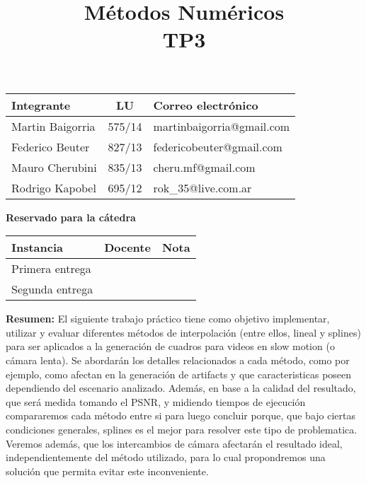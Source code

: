 \documentclass[10pt,a4paper]{article}
\title{Métodos Numéricos \\ TP3}
\begin{document}
\maketitle

\bigskip

\begin{table}[h]
\centering
\begin{tabular}{|l l l|}
\hline
Integrante       & \multicolumn{1}{c}{LU}     & Correo electrónico        \\ \hline
Martin Baigorria & \multicolumn{1}{c}{575/14} & martinbaigorria@gmail.com \\ 
Federico Beuter & 827/13                      & federicobeuter@gmail.com \\
Mauro Cherubini & 835/13                      & cheru.mf@gmail.com \\ 
Rodrigo Kapobel & 695/12                      & rok\_35@live.com.ar \\  \hline
\end{tabular}
\end{table}

\begin{center}
\textbf{Reservado para la cátedra}
\end{center}
\begin{table}[h]
\centering
\begin{tabular}{|l|l|l|}
\hline
Instancia       & Docente & Nota \\ \hline
Primera entrega &         &      \\ \hline
Segunda entrega &         &      \\ \hline
\end{tabular}
\end{table}

\vfill
\textbf{Resumen:} 
El siguiente trabajo práctico tiene como objetivo implementar, utilizar y evaluar diferentes métodos de interpolación (entre ellos, lineal y splines) para ser aplicados a la generación de cuadros para videos en slow motion (o cámara lenta). Se abordarán los detalles relacionados a cada método, como por ejemplo, como afectan en la generación de artifacts y que caracteristicas poseen dependiendo del escenario analizado. Además, en base a la calidad del resultado, que será medida tomando el PSNR, y midiendo tiempos de ejecución compararemos cada método entre si para luego concluir porque, que bajo ciertas condiciones generales, splines es el mejor para resolver este tipo de problematica. Veremos además, que los intercambios de cámara afectarán el resultado ideal, independientemente del método utilizado, para lo cual propondremos una solución que permita evitar este inconveniente.
\end{document}

